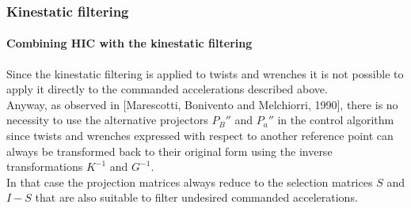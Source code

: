 \begin{frame}[shrink=10]
  \frametitle{Kinestatic filtering}
  \framesubtitle{Combining HIC with the kinestatic filtering}
  Since the kinestatic filtering is applied to twists and wrenches
  it is not possible to apply it directly to the commanded accelerations
  described above.\\
  Anyway, as observed in [Marescotti, Bonivento and Melchiorri, 1990],
  there is no necessity to use the alternative projectors $P_B''$ and
  $P_a''$ in the control algorithm since twists and wrenches expressed
  with respect to another reference point can always be transformed back
  to their original form using the inverse transformations $K^{-1}$ and
  $G^{-1}$.\\
  In that case the projection matrices always reduce to the selection matrices
  $S$ and $I-S$ that are also suitable to filter undesired commanded accelerations.
\end{frame}
